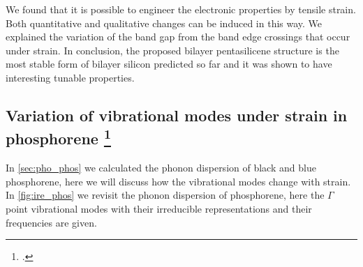 We found that it is possible to engineer the electronic properties by tensile strain. Both quantitative and qualitative changes can be induced in this way. We explained the variation of the band gap from the band edge crossings that occur under strain. In conclusion, the proposed bilayer pentasilicene structure is the most stable form of bilayer silicon predicted so far and it was shown to have interesting tunable properties. 

\subsection[Variation of vibrational modes under strain in phosphorene]{Variation of vibrational modes under strain in phosphorene \footcite[This work is published in:][]{Aierken2015.thermalP}}

In \autoref{sec:pho_phos} we calculated the phonon dispersion of black and blue phosphorene, here we will discuss how the vibrational modes change with strain. In \autoref{fig:ire_phos} we revisit the phonon dispersion of phosphorene, here the $\Gamma$ point vibrational modes with their irreducible representations and their frequencies are given.


